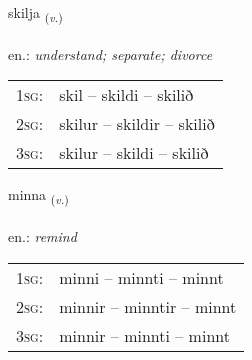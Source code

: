 \documentclass[frontgrid, backgrid]{flacards}\usepackage[]{graphicx}\usepackage[]{xcolor}
\begin{document}
\renewcommand{\flhead}{\vskip5pt \fboxsep=0pt {\small\bfseries\footnotesize Sagnorð | Verb}}
\renewcommand{\fcfoot}{\vskip5pt \fboxsep=0pt \hspace{2pt}{\small\bfseries\footnotesize 1K}}

\renewcommand{\blhead}{\vskip5pt {\small\bfseries\footnotesize Sagnorð | Verb }}
\renewcommand{\bcfoot}{\vskip5pt \hspace{2pt}{\small\bfseries\footnotesize 1K}}


{skilja \small{\textsubscript{(\textit{v.})}} \\[1ex] %
\textphonetic{[scɪlja]} \\
en.: \emph{understand; separate; divorce} \\  [2ex]
\renewcommand*{\arraystretch}{0.8}
\begin{tabular}{p{1cm}l}
\textsc{1sg}: & skil -- skildi -- skilið \\ 
\textsc{2sg}: & skilur -- skildir -- skilið \\ 
\textsc{3sg}: & skilur -- skildi -- skilið \\ 
\end{tabular}
}

\renewcommand{\flhead}{\vskip5pt \fboxsep=0pt {\small\bfseries\footnotesize Sagnorð | Verb}}
\renewcommand{\fcfoot}{\vskip5pt \fboxsep=0pt \hspace{2pt}{\small\bfseries\footnotesize 1K}}

\renewcommand{\blhead}{\vskip5pt {\small\bfseries\footnotesize Sagnorð | Verb }}
\renewcommand{\bcfoot}{\vskip5pt \hspace{2pt}{\small\bfseries\footnotesize 1K}}


{minna \small{\textsubscript{(\textit{v.})}} \\[1ex] %
\textphonetic{[mɪna]} \\
en.: \emph{remind} \\  [2ex]
\renewcommand*{\arraystretch}{0.8}
\begin{tabular}{p{1cm}l}
\textsc{1sg}: & minni -- minnti -- minnt \\ 
\textsc{2sg}: & minnir -- minntir -- minnt \\ 
\textsc{3sg}: & minnir -- minnti -- minnt \\ 
\end{tabular}
}
\end{document}
